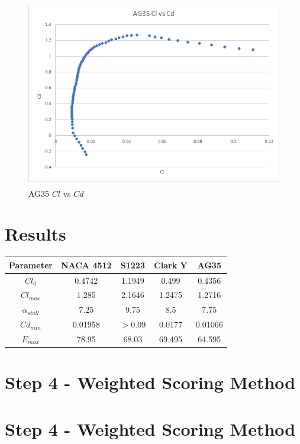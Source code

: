 \documentclass{article}
\begin{document}
\begin{figure}[!h]
\begin{center}
	\includegraphics[scale=1]{ag35clvscd.png}
	\caption{AG35 $Cl$ vs $Cd$}
	\label{Figure 8:}
\end{center}
\end{figure}

\newpage

\section*{Results}
\begin{tabular}[pos]{| c | c | c | c | c |}
\hline
Parameter & NACA 4512 & S1223 & Clark Y & AG35 \\ \hline
$Cl_{0}$ & 0.4742 & 1.1949 & 0.499 & 0.4356   \\ \hline
$Cl_{max}$  & 1.285 & 2.1646 & 1.2475 & 1.2716 \\ \hline
$\alpha_{stall}$ & 7.25 & 9.75 & 8.5 & 7.75 \\ \hline
$Cd_{min}$ & 0.01958 & $>$0.09 & 0.0177 & 0.01066 \\ \hline
$E_{max}$ & 78.95 & 68.03 & 69.495 & 64.595 \\ \hline
\end{tabular}

\section*{Step 4 - Weighted Scoring Method}\section*{Step 4 - Weighted Scoring Method}
\end{document}
